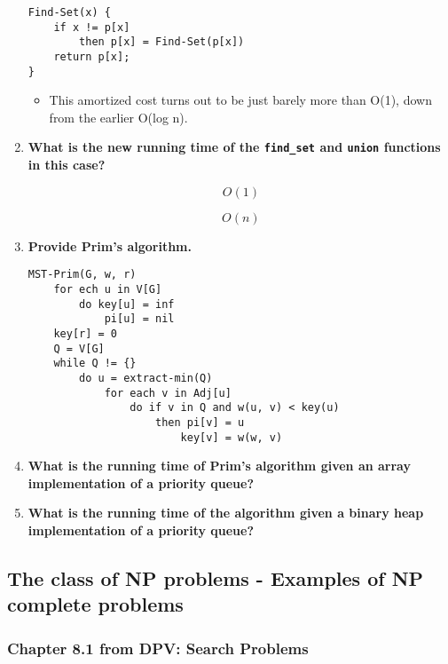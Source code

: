 \documentclass[a4paper,11pt]{article}
\begin{document}
\begin{enumerate}
\begin{verbatim}
Find-Set(x) {
    if x != p[x]
        then p[x] = Find-Set(p[x])
    return p[x];
}
\end{verbatim}

  \begin{itemize}
  \itemsep1pt\parskip0pt
  \item
    This amortized cost turns out to be just barely more than O(1), down
    from the earlier O(log n).
  \end{itemize}
\item
  \textbf{What is the new running time of the \texttt{find\_set} and
  \texttt{union} functions in this case?}

  \[O(1)\]

  \[O(n)\]
\item
  \textbf{Provide Prim's algorithm.}

\begin{verbatim}
MST-Prim(G, w, r)
    for ech u in V[G]
        do key[u] = inf
            pi[u] = nil
    key[r] = 0
    Q = V[G]
    while Q != {}
        do u = extract-min(Q)
            for each v in Adj[u]
                do if v in Q and w(u, v) < key(u)
                    then pi[v] = u
                        key[v] = w(w, v)
\end{verbatim}
\item
  \textbf{What is the running time of Prim's algorithm given an array
  implementation of a priority queue?}
\item
  \textbf{What is the running time of the algorithm given a binary heap
  implementation of a priority queue?}
\end{enumerate}

\subsection{The class of NP problems - Examples of NP complete
problems}\label{the-class-of-np-problems---examples-of-np-complete-problems}

\subsubsection{Chapter 8.1 from DPV: Search
Problems}\label{chapter-8.1-from-dpv-search-problems}
\end{document}

